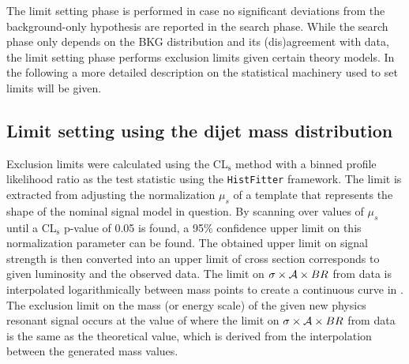 \label{sec:limitsetting}

The limit setting phase is performed in case no significant deviations from the
background-only hypothesis are reported in the search phase. While the search
phase only depends on the BKG
distribution and its (dis)agreement with data, the limit setting phase performs
exclusion limits given certain theory models. In the following a more detailed
description on the statistical machinery used to set limits will be given.

\subsection{Limit setting using the dijet mass distribution}

Exclusion limits were calculated using the CL$_\mathrm{s}$ method with a binned profile likelihood ratio as the test
statistic using the \texttt{HistFitter} \cite{HistFitter:2014} framework.
The limit is extracted from adjusting the normalization $\mu_{s}$ of a template that represents the shape of the nominal signal model in question.
By scanning over values of $\mu_{s}$ until a CL$_\mathrm{s}$ p-value of 0.05 is found,
a 95\% confidence upper limit on this normalization parameter can be found.
The obtained upper limit on signal strength is then converted into an upper limit of cross section
corresponds to given luminosity and the observed data.
The limit on $\sigma\times {\cal A} \times BR$ from data is interpolated logarithmically
between mass points to create a continuous curve in \mjj{}.
The exclusion limit on the mass (or energy scale) of the
given new physics resonant signal occurs at the value of \mjj{} where the limit
on $\sigma\times {\cal A} \times BR$ from data is the same as the
theoretical value, which is derived from the interpolation between
the generated mass values.

